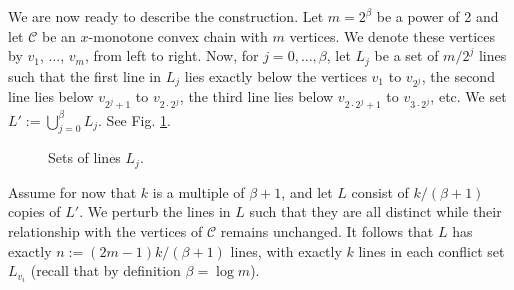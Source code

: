 \documentclass{paper}
\newcommand\eqdef{:=}
\begin{document}
We are now ready to describe the construction. 
Let $m = 2^\beta$ be a power of 2 and 
let $\mathcal{C}$ be an $x$-monotone convex chain with $m$ vertices.
We denote these vertices by
$v_1$, $\ldots$, $v_m$, from left to right. 
Now, for $j = 0, \ldots, \beta$, let
$L_j$ be a set of $m/2^j$ lines such that
the first line in $L_j$ lies exactly below the vertices $v_1$ to $v_{2^j}$,
the second line lies below $v_{2^j+1}$ to $v_{2 \cdot 2^{j}}$,
the third line lies below $v_{2 \cdot 2^j+1}$ to $v_{3 \cdot 2^{j}}$,
etc. We set $L' \eqdef \bigcup_{j=0}^{\beta} L_j$. See Fig. \ref{fig:Ls}.
\begin{center}
\begin{figure}[htb] 
  \centering{} 
  \centering{} 
     \centering{} 
     \caption{Sets of lines $L_j$.} 
       
     \label{fig:Ls} 
\end{figure}
\end{center}













Assume for now that $k$ is a multiple of $\beta + 1$,
and let $L$ consist of $k/(\beta + 1)$ copies of $L'$. We perturb the
lines in $L$ such that they are all distinct while
their relationship with the vertices of $\mathcal{C}$ remains unchanged.
It follows that $L$ has exactly $n \eqdef (2m-1)k/(\beta + 1)$ lines, with 
exactly $k$ lines in each conflict set $L_{v_i}$ (recall that by definition
$\beta = \log m$).
\end{document}
